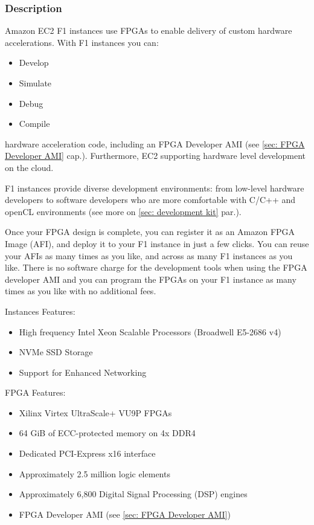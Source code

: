 \documentclass[a4paper]{article}
\begin{document}
    \subsubsection{Description}

    Amazon EC2 F1 instances use FPGAs to enable delivery of custom hardware accelerations. With F1 instances you can:
    \begin{itemize}
        \item Develop
        \item Simulate
        \item Debug
        \item Compile
    \end{itemize}
    hardware acceleration code, including an FPGA Developer AMI (see \ref{sec: FPGA Developer AMI} cap.). Furthermore, EC2 supporting hardware level development on the cloud.\newline

    \noindent
    F1 instances provide diverse development environments: from low-level hardware developers to software developers who are more comfortable with C/C++ and openCL environments (see more on \ref{sec: development kit} par.).\newline

    \noindent
    Once your FPGA design is complete, you can register it as an Amazon FPGA Image (AFI), and deploy it to your F1 instance in just a few clicks. You can reuse your AFIs as many times as you like, and across as many F1 instances as you like. There is no software charge for the development tools when using the FPGA developer AMI and you can program the FPGAs on your F1 instance as many times as you like with no additional fees.\newline

    \noindent
    Instances Features:
    \begin{itemize}
        \item High frequency Intel Xeon Scalable Processors (Broadwell E5-2686 v4)
        \item NVMe SSD Storage
        \item Support for Enhanced Networking
    \end{itemize}
    FPGA Features:
    \begin{itemize}
        \item Xilinx Virtex UltraScale+ VU9P FPGAs
        \item 64 GiB of ECC-protected memory on 4x DDR4
        \item Dedicated PCI-Express x16 interface
        \item Approximately 2.5 million logic elements
        \item Approximately 6,800 Digital Signal Processing (DSP) engines
        \item FPGA Developer AMI (see \ref{sec: FPGA Developer AMI})
    \end{itemize}\newpage
\end{document}
